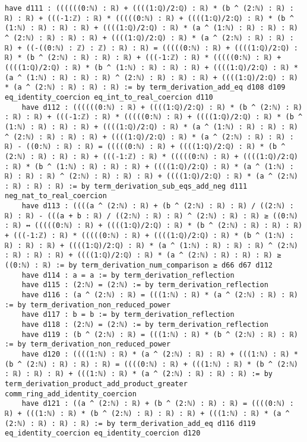 \documentclass{article}
\begin{document}
\begin{tcolorbox}[colback=white!10, width=\linewidth]
\begin{lstlisting}[language=Lean4]
    have d111 : ((((((0:ℕ) : ℝ) + ((((1:ℚ)/2:ℚ) : ℝ) * (b ^ (2:ℕ) : ℝ) : ℝ) : ℝ) + (((-1:ℤ) : ℝ) * (((((0:ℕ) : ℝ) + ((((1:ℚ)/2:ℚ) : ℝ) * (b ^ (1:ℕ) : ℝ) : ℝ) : ℝ) + ((((1:ℚ)/2:ℚ) : ℝ) * (a ^ (1:ℕ) : ℝ) : ℝ) : ℝ) ^ (2:ℕ) : ℝ) : ℝ) : ℝ) + ((((1:ℚ)/2:ℚ) : ℝ) * (a ^ (2:ℕ) : ℝ) : ℝ) : ℝ) + ((-((0:ℕ) : ℤ) : ℤ) : ℝ) : ℝ) = (((((0:ℕ) : ℝ) + ((((1:ℚ)/2:ℚ) : ℝ) * (b ^ (2:ℕ) : ℝ) : ℝ) : ℝ) + (((-1:ℤ) : ℝ) * (((((0:ℕ) : ℝ) + ((((1:ℚ)/2:ℚ) : ℝ) * (b ^ (1:ℕ) : ℝ) : ℝ) : ℝ) + ((((1:ℚ)/2:ℚ) : ℝ) * (a ^ (1:ℕ) : ℝ) : ℝ) : ℝ) ^ (2:ℕ) : ℝ) : ℝ) : ℝ) + ((((1:ℚ)/2:ℚ) : ℝ) * (a ^ (2:ℕ) : ℝ) : ℝ) : ℝ) := by term_derivation_add_eq d108 d109 eq_identity_coercion eq_int_to_real_coercion d110
    have d112 : ((((((0:ℕ) : ℝ) + ((((1:ℚ)/2:ℚ) : ℝ) * (b ^ (2:ℕ) : ℝ) : ℝ) : ℝ) + (((-1:ℤ) : ℝ) * (((((0:ℕ) : ℝ) + ((((1:ℚ)/2:ℚ) : ℝ) * (b ^ (1:ℕ) : ℝ) : ℝ) : ℝ) + ((((1:ℚ)/2:ℚ) : ℝ) * (a ^ (1:ℕ) : ℝ) : ℝ) : ℝ) ^ (2:ℕ) : ℝ) : ℝ) : ℝ) + ((((1:ℚ)/2:ℚ) : ℝ) * (a ^ (2:ℕ) : ℝ) : ℝ) : ℝ) - ((0:ℕ) : ℝ) : ℝ) = (((((0:ℕ) : ℝ) + ((((1:ℚ)/2:ℚ) : ℝ) * (b ^ (2:ℕ) : ℝ) : ℝ) : ℝ) + (((-1:ℤ) : ℝ) * (((((0:ℕ) : ℝ) + ((((1:ℚ)/2:ℚ) : ℝ) * (b ^ (1:ℕ) : ℝ) : ℝ) : ℝ) + ((((1:ℚ)/2:ℚ) : ℝ) * (a ^ (1:ℕ) : ℝ) : ℝ) : ℝ) ^ (2:ℕ) : ℝ) : ℝ) : ℝ) + ((((1:ℚ)/2:ℚ) : ℝ) * (a ^ (2:ℕ) : ℝ) : ℝ) : ℝ) := by term_derivation_sub_eqs_add_neg d111 neg_nat_to_real_coercion
    have d113 : ((((a ^ (2:ℕ) : ℝ) + (b ^ (2:ℕ) : ℝ) : ℝ) / ((2:ℕ) : ℝ) : ℝ) - (((a + b : ℝ) / ((2:ℕ) : ℝ) : ℝ) ^ (2:ℕ) : ℝ) : ℝ) ≥ ((0:ℕ) : ℝ) ↔ (((((0:ℕ) : ℝ) + ((((1:ℚ)/2:ℚ) : ℝ) * (b ^ (2:ℕ) : ℝ) : ℝ) : ℝ) + (((-1:ℤ) : ℝ) * (((((0:ℕ) : ℝ) + ((((1:ℚ)/2:ℚ) : ℝ) * (b ^ (1:ℕ) : ℝ) : ℝ) : ℝ) + ((((1:ℚ)/2:ℚ) : ℝ) * (a ^ (1:ℕ) : ℝ) : ℝ) : ℝ) ^ (2:ℕ) : ℝ) : ℝ) : ℝ) + ((((1:ℚ)/2:ℚ) : ℝ) * (a ^ (2:ℕ) : ℝ) : ℝ) : ℝ) ≥ ((0:ℕ) : ℝ) := by term_derivation_num_comparison ≥ d66 d67 d112
    have d114 : a = a := by term_derivation_reflection
    have d115 : (2:ℕ) = (2:ℕ) := by term_derivation_reflection
    have d116 : (a ^ (2:ℕ) : ℝ) = (((1:ℕ) : ℝ) * (a ^ (2:ℕ) : ℝ) : ℝ) := by term_derivation_non_reduced_power
    have d117 : b = b := by term_derivation_reflection
    have d118 : (2:ℕ) = (2:ℕ) := by term_derivation_reflection
    have d119 : (b ^ (2:ℕ) : ℝ) = (((1:ℕ) : ℝ) * (b ^ (2:ℕ) : ℝ) : ℝ) := by term_derivation_non_reduced_power
    have d120 : ((((1:ℕ) : ℝ) * (a ^ (2:ℕ) : ℝ) : ℝ) + (((1:ℕ) : ℝ) * (b ^ (2:ℕ) : ℝ) : ℝ) : ℝ) = ((((0:ℕ) : ℝ) + (((1:ℕ) : ℝ) * (b ^ (2:ℕ) : ℝ) : ℝ) : ℝ) + (((1:ℕ) : ℝ) * (a ^ (2:ℕ) : ℝ) : ℝ) : ℝ) := by term_derivation_product_add_product_greater comm_ring_add_identity_coercion
    have d121 : ((a ^ (2:ℕ) : ℝ) + (b ^ (2:ℕ) : ℝ) : ℝ) = ((((0:ℕ) : ℝ) + (((1:ℕ) : ℝ) * (b ^ (2:ℕ) : ℝ) : ℝ) : ℝ) + (((1:ℕ) : ℝ) * (a ^ (2:ℕ) : ℝ) : ℝ) : ℝ) := by term_derivation_add_eq d116 d119 eq_identity_coercion eq_identity_coercion d120

\end{lstlisting}
\end{tcolorbox}
\end{document}
